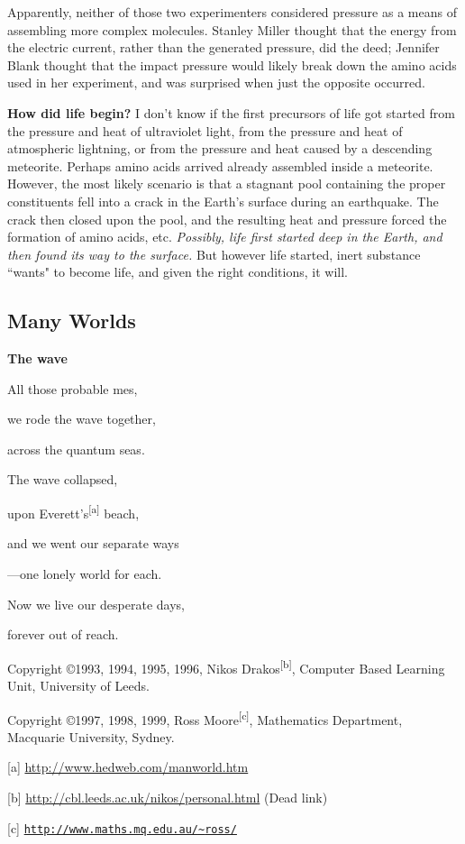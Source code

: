 \documentclass{article}
\theoremstyle{definition}
\begin{document}
Apparently, neither of those two experimenters considered pressure as a means of assembling more complex molecules. Stanley Miller thought that the energy from the electric current, rather than the generated pressure, did the deed; Jennifer Blank thought that the impact pressure would likely break down the amino acids used in her experiment, and was surprised when just the opposite occurred.

\textbf{How did life begin?} I don't know if the first precursors of life got started from the pressure and heat of ultraviolet light, from the pressure and heat of atmospheric lightning, or from the pressure and heat caused by a descending meteorite. Perhaps amino acids arrived already assembled inside a meteorite. However, the most likely scenario is that a stagnant pool containing the proper constituents fell into a crack in the Earth's surface during an earthquake. The crack then closed upon the pool, and the resulting heat and pressure forced the formation of amino acids, etc. \emph{Possibly, life first started deep in the Earth, and then found its way to the surface.} But however life started, inert substance ``wants" to become life, and given the right conditions, it will.

\subsection{Many Worlds}

\begin{center}
\textbf{The wave}

All those probable mes,

we rode the wave together,

across the quantum seas.

The wave collapsed,

upon Everett's\textsuperscript{[a]} beach,

and we went our separate ways

---one lonely world for each.

Now we live our desperate days,

forever out of reach.

\end{center}

Copyright \copyright 1993, 1994, 1995, 1996, Nikos Drakos\textsuperscript{[b]}, Computer Based Learning Unit, University of Leeds. 

\smallskip

Copyright \copyright 1997, 1998, 1999, Ross Moore\textsuperscript{[c]}, Mathematics Department, Macquarie University, Sydney.

\bigskip

[a] \url{http://www.hedweb.com/manworld.htm}

[b] \url{http://cbl.leeds.ac.uk/nikos/personal.html} (Dead link)

[c] \href{http://www.maths.mq.edu.au/~ross/}{\texttt{http://www.maths.mq.edu.au/{\textasciitilde}ross/}}
\end{document}
